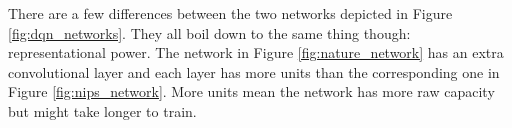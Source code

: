 There are a few differences between the two networks
depicted in Figure \ref{fig:dqn_networks}.
They all boil down to the same thing though:
representational power.
The network in Figure \ref{fig:nature_network}
has an extra convolutional layer
and each layer has more units than the corresponding one
in Figure \ref{fig:nips_network}.
More units mean the network has more raw capacity
but might take longer to train.

